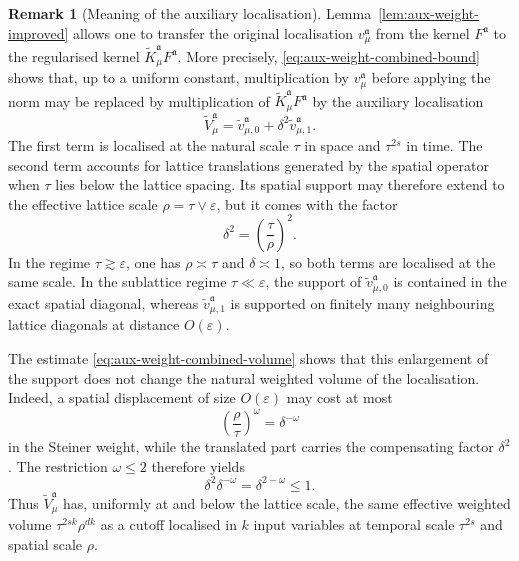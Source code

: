 \documentclass{article}
\numberwithin{equation}{section}
\theoremstyle{plain}
\theoremstyle{definition}
\newtheorem{remark}[theorem]{Remark}
\begin{document}
\begin{remark}[Meaning of the auxiliary localisation]
    Lemma~\ref{lem:aux-weight-improved} allows one to transfer the original localisation
	\(v_\mu^{\mathfrak a}\) from the kernel
	\(F^{\mathfrak a}\) to the regularised kernel
	\(\tilde K_\mu^{\mathfrak a}F^{\mathfrak a}\). More precisely,
	\eqref{eq:aux-weight-combined-bound} shows that, up to a uniform
	constant, multiplication by \(v_\mu^{\mathfrak a}\) before applying
	the norm may be replaced by multiplication of
	\(\tilde K_\mu^{\mathfrak a}F^{\mathfrak a}\) by the auxiliary
	localisation
	\[
	\tilde V_\mu^{\mathfrak a}
	=
	\tilde v_{\mu,0}^{\mathfrak a}
	+\delta^2\tilde v_{\mu,1}^{\mathfrak a}.
	\]
	The first term is localised at the natural scale \(\tau\) in space
	and \(\tau^{2s}\) in time. The second term accounts for lattice
	translations generated by the spatial operator when \(\tau\) lies
	below the lattice spacing. Its spatial support may therefore extend
	to the effective lattice scale
	\(\rho=\tau\vee\varepsilon\), but it comes with the factor
	\[
	\delta^2
	=
	\left(\frac{\tau}{\rho}\right)^2.
	\]
	In the regime \(\tau\gtrsim\varepsilon\), one has
	\(\rho\asymp\tau\) and \(\delta\asymp1\), so both terms are
	localised at the same scale. In the sublattice regime
	\(\tau\ll\varepsilon\), the support of
	\(\tilde v_{\mu,0}^{\mathfrak a}\) is contained in the exact spatial
	diagonal, whereas \(\tilde v_{\mu,1}^{\mathfrak a}\) is supported on
	finitely many neighbouring lattice diagonals at distance
	\(O(\varepsilon)\).
	
	The estimate \eqref{eq:aux-weight-combined-volume} shows that this
	enlargement of the support does not change the natural weighted
	volume of the localisation. Indeed, a spatial displacement of size
	\(O(\varepsilon)\) may cost at most
	\[
	\left(\frac{\rho}{\tau}\right)^\omega
	=
	\delta^{-\omega}
	\]
	in the Steiner weight, while the translated part carries the
	compensating factor \(\delta^2\). The restriction
	\(\omega\leqslant2\) therefore yields
	\[
	\delta^2\delta^{-\omega}
	=
	\delta^{2-\omega}
	\leqslant1.
	\]
	Thus \(\tilde V_\mu^{\mathfrak a}\) has, uniformly at and below the
	lattice scale, the same effective weighted volume
	\(\tau^{2sk}\rho^{dk}\) as a cutoff localised in \(k\) input
	variables at temporal scale \(\tau^{2s}\) and spatial scale \(\rho\).
\end{remark}
\end{document}
